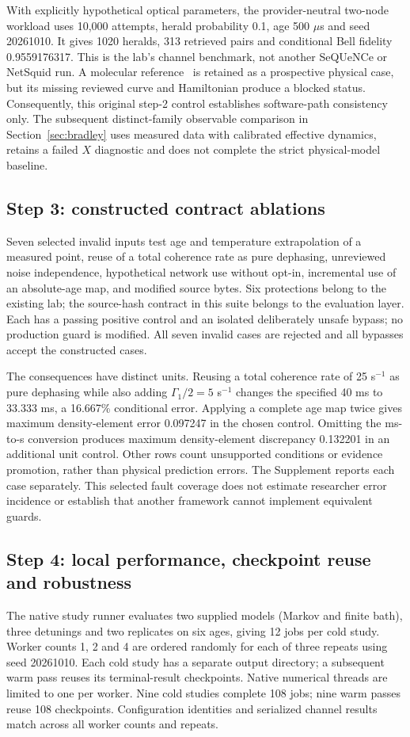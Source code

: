\documentclass[11pt,a4paper]{article}
\begin{document}
With explicitly hypothetical optical parameters, the provider-neutral two-node workload uses 10,000 attempts, herald probability 0.1, age 500 $\mu$s and seed 20261010. It gives 1020 heralds, 313 retrieved pairs and conditional Bell fidelity 0.9559176317. This is the lab's channel benchmark, not another SeQUeNCe or NetSquid run. A molecular reference~\cite{lin} is retained as a prospective physical case, but its missing reviewed curve and Hamiltonian produce a blocked status. Consequently, this original step-2 control establishes software-path consistency only. The subsequent distinct-family observable comparison in Section~\ref{sec:bradley} uses measured data with calibrated effective dynamics, retains a failed $X$ diagnostic and does not complete the strict physical-model baseline.

\subsection{Step 3: constructed contract ablations}
Seven selected invalid inputs test age and temperature extrapolation of a measured point, reuse of a total coherence rate as pure dephasing, unreviewed noise independence, hypothetical network use without opt-in, incremental use of an absolute-age map, and modified source bytes. Six protections belong to the existing lab; the source-hash contract in this suite belongs to the evaluation layer. Each has a passing positive control and an isolated deliberately unsafe bypass; no production guard is modified. All seven invalid cases are rejected and all bypasses accept the constructed cases.

The consequences have distinct units. Reusing a total coherence rate of 25 s$^{-1}$ as pure dephasing while also adding $\Gamma_1/2=5$ s$^{-1}$ changes the specified 40 ms to 33.333 ms, a 16.667\% conditional error. Applying a complete age map twice gives maximum density-element error 0.097247 in the chosen control. Omitting the ms-to-s conversion produces maximum density-element discrepancy 0.132201 in an additional unit control. Other rows count unsupported conditions or evidence promotion, rather than physical prediction errors. The Supplement reports each case separately. This selected fault coverage does not estimate researcher error incidence or establish that another framework cannot implement equivalent guards.

\subsection{Step 4: local performance, checkpoint reuse and robustness}
The native study runner evaluates two supplied models (Markov and finite bath), three detunings and two replicates on six ages, giving 12 jobs per cold study. Worker counts 1, 2 and 4 are ordered randomly for each of three repeats using seed 20261010. Each cold study has a separate output directory; a subsequent warm pass reuses its terminal-result checkpoints. Native numerical threads are limited to one per worker. Nine cold studies complete 108 jobs; nine warm passes reuse 108 checkpoints. Configuration identities and serialized channel results match across all worker counts and repeats.

\end{document}
